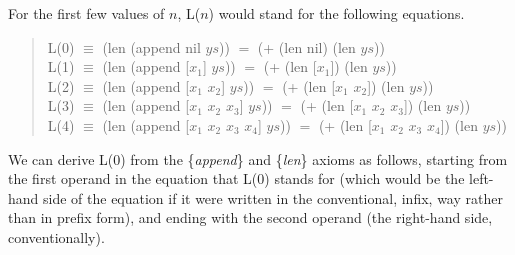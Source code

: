For the first few values of $n$, L($n$) would stand for the following equations.
\begin{quote}
L(0) $\equiv$ (len (append nil $ys$)) $=$ (+ (len nil) (len $ys$)) \\
L(1) $\equiv$ (len (append [$x_1$] $ys$)) $=$ (+ (len [$x_1$]) (len $ys$)) \\
L(2) $\equiv$ (len (append [$x_1$ $x_2$] $ys$)) $=$ (+ (len [$x_1$ $x_2$]) (len $ys$)) \\
L(3) $\equiv$ (len (append [$x_1$ $x_2$ $x_3$] $ys$)) $=$ (+ (len [$x_1$ $x_2$ $x_3$]) (len $ys$)) \\
L(4) $\equiv$ (len (append [$x_1$ $x_2$ $x_3$ $x_4$] $ys$)) $=$ (+ (len [$x_1$ $x_2$ $x_3$ $x_4$]) (len $ys$))
\end{quote}


We can derive L(0) from the \{\emph{append}\} and \{\emph{len}\} axioms as follows,
starting from the first operand in the equation that L(0) stands for
(which would be the left-hand side of the equation
if it were written in the conventional, infix, way rather than in prefix form),
and ending with the second operand (the right-hand side, conventionally).

